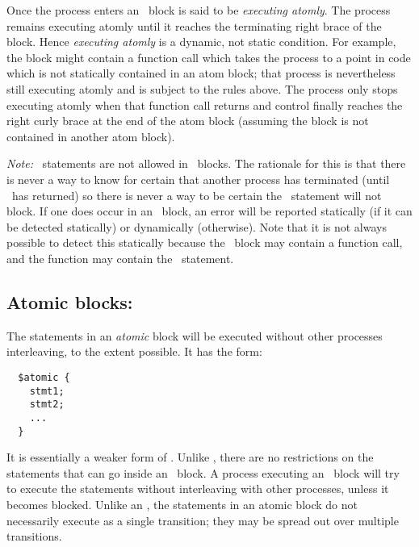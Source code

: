 Once the process enters an \catom\ block is said to be \emph{executing
  atomly}.  The process remains executing atomly until it reaches the
terminating right brace of the block.  Hence \emph{executing atomly}
is a dynamic, not static condition.  For example, the block might
contain a function call which takes the process to a point in code
which is not statically contained in an atom block; that process is
nevertheless still executing atomly and is subject to the rules above.
The process only stops executing atomly when that function call
returns and control finally reaches the right curly brace at the end
of the atom block (assuming the block is not contained in another atom
block).

\emph{Note:} \cwait\ statements are not allowed in \catom\ blocks.
The rationale for this is that there is never a way to know for
certain that another process has terminated (until \cwait\ has
returned) so there is never a way to be certain the \cwait\ statement
will not block.  If one does occur in an \catom\ block, an error will
be reported statically (if it can be detected statically) or
dynamically (otherwise).  Note that it is not always possible to
detect this statically because the \catom\ block may contain a
function call, and the function may contain the \cwait\ statement.

\subsection{Atomic blocks: \catomic}

The statements in an \emph{atomic} block will be executed without
other processes interleaving, to the extent possible.  It has the
form:
\begin{verbatim}
  $atomic {
    stmt1;
    stmt2;
    ...
  }
\end{verbatim}
It is essentially a weaker form of \catom.  Unlike \catom, there are
no restrictions on the statements that can go inside an \catomic\
block.  A process executing an \catomic~block will try to execute the
statements without interleaving with other processes, unless it
becomes blocked.  Unlike an \catom, the statements in an atomic block
do not necessarily execute as a single transition; they may be spread
out over multiple transitions.

